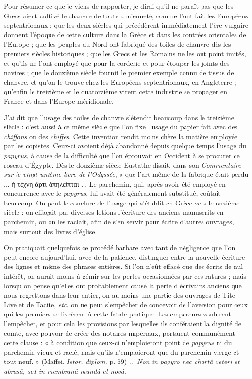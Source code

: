 \documentclass[a4paper, 11pt, oneside, polutonikogreek, french]{article}
\begin{document}
Pour résumer ce que je viens de rapporter, je dirai qu'il ne paraît pas que les Grecs aient cultivé le chanvre de toute ancienneté, comme l'ont fait les Européens septentrionaux ; que les deux siècles qui précédèrent immédiatement l'ère vulgaire donnent l'époque de cette culture dans la Grèce et dans les contrées orientales de l'Europe ; que les peuples du Nord ont fabriqué des toiles de chanvre dès les premiers siècles historiques ; que les Grecs et les Romains ne les ont point imités, et qu'ils ne l'ont employé que pour la corderie et pour étouper les joints des navires ; que le douzième siècle fournit le premier exemple connu de tissus de chanvre, et qu'on le trouve chez les Européens septentrionaux, en Angleterre ; qu'enfin le treizième et le quatorzième virent cette industrie se propager en France et dans l'Europe méridionale.

J'ai dit que l'usage des toiles de chanvre s'étendit beaucoup dans le treizième siècle : c'est aussi à ce même siècle que l'on fixe l'usage du papier fait avec des \emph{chiffons} ou des \emph{chiffes}. Cette invention rendit moins chère la matière employée par les copistes. Ceux-ci avoient déjà abandonné depuis quelque temps l'usage du \emph{papyrus}, à cause de la difficulté que l'on éprouvait en Occident à se procurer ce roseau d'Égypte. Dès le douzième siècle Eustathe disait, dans son \emph{Commentaire sur le vingt unième livre de l'Odyssée}, « que l'art même de la fabrique était perdu ... ἡ τέχνη ἄρτι ἀπηλείπται ... Le parchemin, qui, après avoir été employé en concurrence avec le \emph{papyrus}, lui avait été généralement substitué, coûtait beaucoup. On peut le conclure de l'usage qui s'établit en Grèce vers le onzième siècle : on effaçait par diverses lotions l'écriture des anciens manuscrits en parchemin, ou on les raclait, afin de s'en servir pour écrire d'autres ouvrages, mais surtout des livres d'église.

On pratiquait quelquefois ce procédé barbare avec tant de négligence que l'on peut encore aujourd'hui, avec de la patience, distinguer entre la nouvelle écriture des lignes et même des phrases entières. Si l'on n'eût effacé que des écrits de nul intérêt, on aurait moins à gémir sur les pertes occasionnées par ces ratures ; mais lorsqu'on pense qu'elles ont probablement causé la perte d'écrivains anciens que nous regrettons dans leur entier, on au moins une partie des ouvrages de Tite-Live et de Tacite, \emph{etc.} on ne peut s'empêcher de concevoir de l'aversion pour ceux qui les premiers se livrèrent à cette fatale pratique. Les empereurs voulurent l'empêcher, et pour cela les provisions par lesquelles ils conféraient la dignité de comte, avec pouvoir de créer des notaires impériaux, portaient communément cette clause : « à condition que ceux-ci n'emploieront point de \emph{papyrus} ni du parchemin vieux et raclé, mais qu'ils n'emploieront que du parchemin vierge et tout neuf. » (Maffei, \emph{Istor. diplom.} p. 69) ... \emph{Non in papyro nec chartâ veteri et abrasâ, sed in membranâ mundâ et novâ}.
\end{document}
